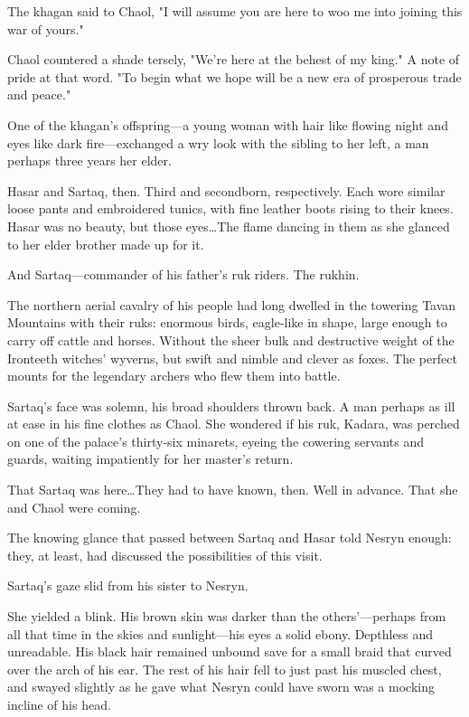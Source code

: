 The khagan said to Chaol, "I will assume you are here to woo me into joining this war of yours."

Chaol countered a shade tersely, "We're here at the behest of my king." A note of pride at that word. "To begin what we hope will be a new era of prosperous trade and peace."

One of the khagan's offspring---a young woman with hair like flowing night and eyes like dark fire---exchanged a wry look with the sibling to her left, a man perhaps three years her elder.

Hasar and Sartaq, then. Third and secondborn, respectively. Each wore similar loose pants and embroidered tunics, with fine leather boots rising to their knees. Hasar was no beauty, but those eyes\ldots The flame dancing in them as she glanced to her elder brother made up for it.

And Sartaq---commander of his father's ruk riders. The rukhin.

The northern aerial cavalry of his people had long dwelled in the towering Tavan Mountains with their ruks: enormous birds, eagle-like in shape, large enough to carry off cattle and horses. Without the sheer bulk and destructive weight of the Ironteeth witches' wyverns, but swift and nimble and clever as foxes. The perfect mounts for the legendary archers who flew them into battle.

Sartaq's face was solemn, his broad shoulders thrown back. A man perhaps as ill at ease in his fine clothes as Chaol. She wondered if his ruk, Kadara, was perched on one of the palace's thirty-six minarets, eyeing the cowering servants and guards, waiting impatiently for her master's return.

That Sartaq was here\ldots They had to have known, then. Well in advance. That she and Chaol were coming.

The knowing glance that passed between Sartaq and Hasar told Nesryn enough: they, at least, had discussed the possibilities of this visit.

Sartaq's gaze slid from his sister to Nesryn.

She yielded a blink. His brown skin was darker than the others'---perhaps from all that time in the skies and sunlight---his eyes a solid ebony. Depthless and unreadable. His black hair remained unbound save for a small braid that curved over the arch of his ear. The rest of his hair fell to just past his muscled chest, and swayed slightly as he gave what Nesryn could have sworn was a mocking incline of his head.

